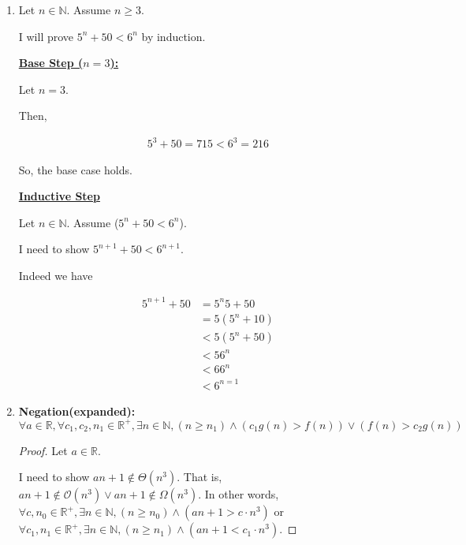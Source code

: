 \documentclass[12pt]{article}
\begin{document}
\begin{enumerate}[1.]
\begin{enumerate}[a)]
    \end{enumerate}

    \item Let $n \in \mathbb{N}$. Assume $n \geq 3$.
    \setcounter{equation}{0}
    \bigskip

    I will prove $5^n + 50 < 6^n$ by induction.

    \bigskip

    \underline{\textbf{Base Step ($n = 3$):}}

    \bigskip

    Let $n = 3$.

    \bigskip

    Then,

    \begin{align}
        5^3 + 50 = 715 < 6^3 = 216
    \end{align}

    \bigskip

    So, the base case holds.

    \bigskip

    \underline{\textbf{Inductive Step}}

    \bigskip

    Let $n \in \mathbb{N}$. Assume ($5^n + 50 < 6^n$).

    \bigskip

    I need to show $5^{n+1} + 50 < 6^{n+1}$.

    \bigskip

    Indeed we have

    \begin{align}
        5^{n+1} + 50 &= 5^n5 + 50\\
        &= 5(5^n + 10)\\
        &< 5(5^n + 50)\\
        &< 56^n\\
        &< 66^n\\
        &< 6^{n=1}
    \end{align}

    \item
    \setcounter{equation}{0}
    \textbf{Negation(expanded):} $\forall a \in \mathbb{R}, \forall c_1, c_2, n_1 \in \mathbb{R}^+, \exists n \in \mathbb{N},
    (n \geq n_1) \land (c_1 g(n) > f(n)) \lor (f(n) > c_2g(n))$

    \bigskip
    \begin{proof}
        Let $a \in \mathbb{R}$.

        \bigskip

        I need to show $an+1 \notin \Theta(n^3)$. That is, $an + 1 \notin \mathcal{O}(n^3) \lor an+1 \notin \Omega(n^3)$.
        In other words, $\forall c, n_0 \in \mathbb{R}^+, \exists n \in \mathbb{N}, (n \geq n_0) \land (an+1 > c \cdot n^3)$ or
        $\forall c_1, n_1 \in \mathbb{R}^+, \exists n \in \mathbb{N}, (n \geq n_1) \land (an+1 < c_1 \cdot n^3)$.


\end{proof}
\end{enumerate}
\end{document}

